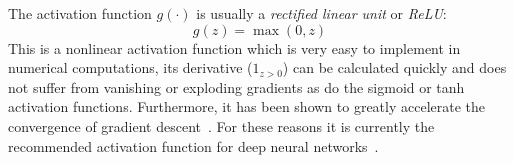 The activation function $g(\cdot)$ is usually a \emph{rectified linear unit} or \emph{ReLU}:
\begin{equation}
	g(z) = \max(0,z)
\end{equation}
This is a nonlinear activation function which is very easy to implement in numerical computations, its derivative ($1_{z>0}$) can be calculated quickly and does not suffer from vanishing or exploding gradients as do the sigmoid or tanh activation functions. Furthermore, it has been shown to greatly accelerate the convergence of gradient descent~\cite{Krizhevsky2012}. For these reasons it is currently the recommended activation function for deep neural networks~\cite{Karpathy2015}.

